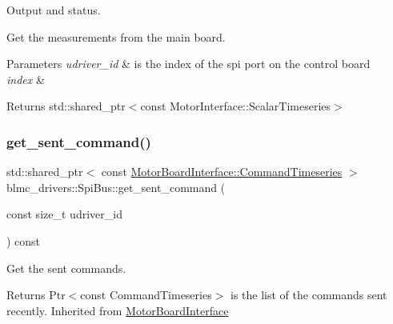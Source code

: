Output and status. 

Get the measurements from the main board.


\begin{DoxyParams}{Parameters}
{\em udriver\+\_\+id} & is the index of the spi port on the control board \\
\hline
{\em index} & \\
\hline
\end{DoxyParams}
\begin{DoxyReturn}{Returns}
std\+::shared\+\_\+ptr$<$const Motor\+Interface\+::\+Scalar\+Timeseries$>$ 
\end{DoxyReturn}
\mbox{\label{classblmc__drivers_1_1SpiBus_ad1f3cdf8a05233b007a81f3752dc2a92}} 
\subsubsection{\texorpdfstring{get\+\_\+sent\+\_\+command()}{get\_sent\_command()}}
{\footnotesize\ttfamily std\+::shared\+\_\+ptr$<$ const \hyperlink{classblmc__drivers_1_1MotorBoardInterface_ae2afe94a023d9f08a4c689e9b7660f15}{Motor\+Board\+Interface\+::\+Command\+Timeseries} $>$ blmc\+\_\+drivers\+::\+Spi\+Bus\+::get\+\_\+sent\+\_\+command (\begin{DoxyParamCaption}\item[{const size\+\_\+t}]{udriver\+\_\+id }\end{DoxyParamCaption}) const\hspace{0.3cm}{\ttfamily [virtual]}}



Get the sent commands. 

\begin{DoxyReturn}{Returns}
Ptr$<$const Command\+Timeseries$>$ is the list of the commands sent recently. Inherited from \hyperlink{classblmc__drivers_1_1MotorBoardInterface}{Motor\+Board\+Interface} 
\end{DoxyReturn}
\mbox{\label{classblmc__drivers_1_1SpiBus_a2b94f55bf4a71e0d819653c99fe4bce9}} 
